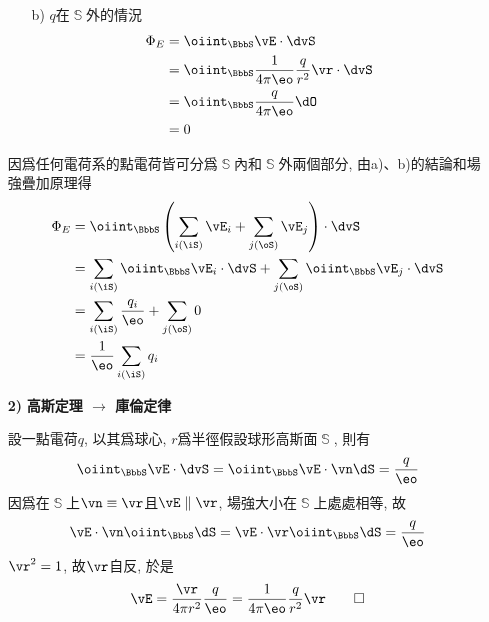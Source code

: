 \begin{solve}
\begin{itemize}
\begin{multicols}{2}
\begin{itemize}
                      \item[b)] $q$在$\BbbS$外的情況
                            \begin{align*}
                                \Phi_E & = \oiint_{\BbbS} \vE \cdot \dvS                                 \\
                                       & = \oiint_{\BbbS} \frac{1}{4\pi\eo} \frac{q}{r^2} \vr \cdot \dvS \\
                                       & = \oiint_{\BbbS} \frac{q}{4\pi\eo} \dO                          \\
                                       & = 0
                            \end{align*}
                  \end{itemize}
              \end{multicols}

              因爲任何電荷系的點電荷皆可分爲$\BbbS$內和$\BbbS$外兩個部分, 由a)、b)的結論和場強疊加原理得
              \begin{align*}
                  \Phi_E & = \oiint_{\BbbS}\left(\sum_{i(\iS)}\vE_i + \sum_{j(\oS)}\vE_j\right)\cdot \dvS            \\
                         & = \sum_{i(\iS)}\oiint_{\BbbS}\vE_i\cdot \dvS + \sum_{j(\oS)}\oiint_{\BbbS}\vE_j\cdot \dvS \\
                         & = \sum_{i(\iS)}\frac{q_i}{\eo} + \sum_{j(\oS)} 0                                          \\
                         & = \frac{1}{\eo}\sum_{i(\iS)} q_i                                                          \\
              \end{align*}


        \item[\textbf{2)}] \textbf{高斯定理 $\rightarrow$ 庫倫定律}

              設一點電荷$q$, 以其爲球心, $r$爲半徑假設球形高斯面$\BbbS$, 則有
              $$\oiint_{\BbbS} \vE \cdot \dvS = \oiint_{\BbbS} \vE \cdot \vn \dS = \frac{q}{\eo}$$
              因爲在$\BbbS$上$\vn \equiv \vr$且$\vE \parallel \vr$, 場強大小在$\BbbS$上處處相等, 故
              $$\vE \cdot \vn \oiint_{\BbbS} \dS = \vE \cdot \vr \oiint_{\BbbS} \dS = \frac{q}{\eo}$$
              $\vr^2 = 1$, 故$\vr$自反, 於是
              \begin{equation*}
                  \vE = \frac{\vr}{4\pi r^2}\frac{q}{\eo} = \frac{1}{4\pi\eo}\frac{q}{r^2}\vr \qedhere
              \end{equation*}
    \end{itemize}
\end{solve}